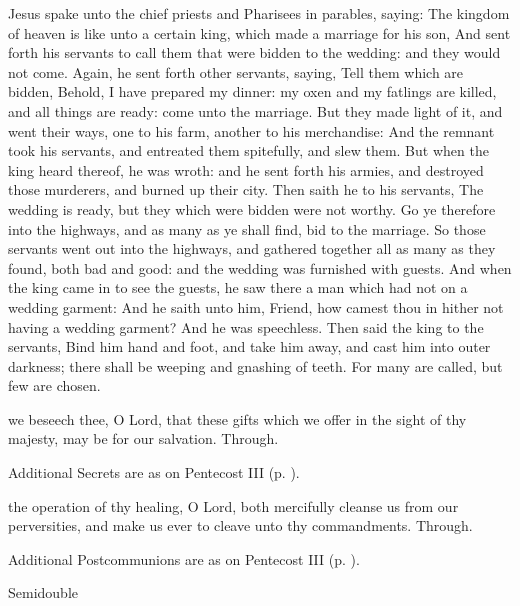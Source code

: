  Jesus spake unto the chief priests and Pharisees in parables, saying: The kingdom of heaven is like unto a certain king, which made a marriage for his son, And sent forth his servants to call them that were bidden to the wedding: and they would not come. Again, he sent forth other servants, saying, Tell them which are bidden, Behold, I have prepared my dinner: my oxen and my fatlings are killed, and all things are ready: come unto the marriage. But they made light of it, and went their ways, one to his farm, another to his merchandise: And the remnant took his servants, and entreated them spitefully, and slew them. But when the king heard thereof, he was wroth: and he sent forth his armies, and destroyed those murderers, and burned up their city. Then saith he to his servants, The wedding is ready, but they which were bidden were not worthy. Go ye therefore into the highways, and as many as ye shall find, bid to the marriage. So those servants went out into the highways, and gathered together all as many as they found, both bad and good: and the wedding was furnished with guests. And when the king came in to see the guests, he saw there a man which had not on a wedding garment: And he saith unto him, Friend, how camest thou in hither not having a wedding garment? And he was speechless. Then said the king to the servants, Bind him hand and foot, and take him away, and cast him into outer darkness; there shall be weeping and gnashing of teeth. For many are called, but few are chosen.

\secret
{} we beseech thee, O Lord, that these gifts which we offer in the sight of thy majesty, may be for our salvation. Through.
\begin{rubric}
    Additional Secrets are as on Pentecost III (p. \pageref{PentecostIII}).
\end{rubric}

\postcommunion
{} the operation of thy healing, O Lord, both mercifully cleanse us from our perversities, and make us ever to cleave unto thy commandments. Through.
\begin{rubric}
    Additional Postcommunions are as on Pentecost III (p. \pageref{PentecostIII}).
\end{rubric}

\begin{inhead}
{Semidouble}
\end{inhead}

